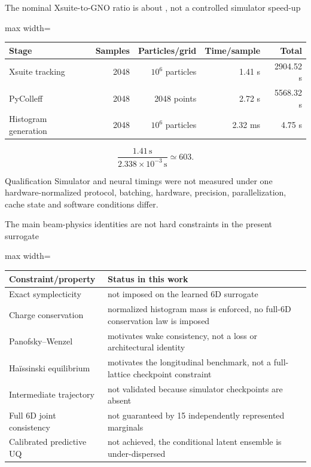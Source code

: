 \begin{frame}[t,shrink=5]{The nominal Xsuite-to-GNO ratio is about , not a controlled simulator speed-up}
\begin{center}\begin{adjustbox}{max width=\linewidth}
\begin{tabular}{lrrrr}\toprule Stage & Samples & Particles/grid & Time/sample & Total\\\midrule
Xsuite tracking & 2048 & $10^6$ particles & 1.41 s & 2904.52 s\\
PyColleff & 2048 & 2048 points & 2.72 s & 5568.32 s\\
Histogram generation & 2048 & $10^6$ particles & 2.32 ms & 4.75 s\\\bottomrule\end{tabular}
\end{adjustbox}\end{center}\[\frac{1.41\,\mathrm s}{2.338\times10^{-3}\,\mathrm s}\simeq603.\]\begin{block}{Qualification}
Simulator and neural timings were not measured under one hardware-normalized protocol, batching, hardware, precision, parallelization, cache state and software conditions differ.
\end{block}

\end{frame}

\begin{frame}[t,shrink=5]{The main beam-physics identities are not hard constraints in the present surrogate}
\begin{center}\begin{adjustbox}{max width=\linewidth}
\begin{tabular}{p{}p{}}\toprule Constraint/property & Status in this work\\\midrule
Exact symplecticity & not imposed on the learned 6D surrogate\\
Charge conservation & normalized histogram mass is enforced, no full-6D conservation law is imposed\\
Panofsky--Wenzel & motivates wake consistency, not a loss or architectural identity\\
Haïssinski equilibrium & motivates the longitudinal benchmark, not a full-lattice checkpoint constraint\\
Intermediate trajectory & not validated because simulator checkpoints are absent\\
Full 6D joint consistency & not guaranteed by 15 independently represented marginals\\
Calibrated predictive UQ & not achieved, the conditional latent ensemble is under-dispersed\\\bottomrule\end{tabular}
\end{adjustbox}\end{center}

\end{frame}

